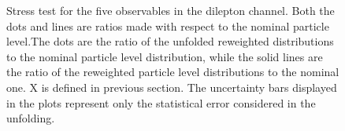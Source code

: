 \begin{figure}[ht]
  \quad\quad
  \caption{Stress test for the five observables in the dilepton channel. Both the dots and lines are ratios made with respect to the nominal particle level.The dots are the ratio of the unfolded reweighted distributions to the nominal particle level distribution, while the solid lines are the ratio of the reweighted particle level distributions to the nominal one. X is defined in previous section. The uncertainty bars displayed in the plots represent only 
  the statistical error considered in the unfolding.}
  \label{fig:unfolded_dilep_dist_stress_test_1}
\end{figure}

